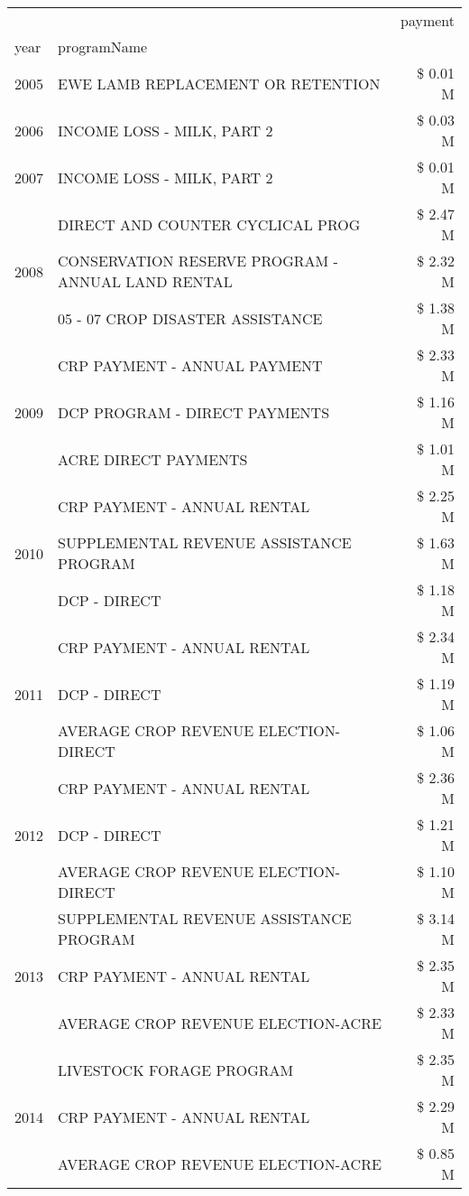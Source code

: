 \begin{tabular}{llr}
\toprule
 &  & payment \\
year & programName &  \\
\midrule
2005 & EWE LAMB REPLACEMENT OR RETENTION & \$ 0.01 M \\
\cline{1-3}
2006 & INCOME LOSS - MILK, PART 2 & \$ 0.03 M \\
\cline{1-3}
2007 & INCOME LOSS - MILK, PART 2 & \$ 0.01 M \\
\cline{1-3}
\multirow[t]{3}{*}{2008} & DIRECT AND COUNTER CYCLICAL PROG & \$ 2.47 M \\
 & CONSERVATION RESERVE PROGRAM - ANNUAL LAND RENTAL & \$ 2.32 M \\
 & 05 - 07 CROP DISASTER ASSISTANCE & \$ 1.38 M \\
\cline{1-3}
\multirow[t]{3}{*}{2009} & CRP PAYMENT - ANNUAL PAYMENT & \$ 2.33 M \\
 & DCP PROGRAM - DIRECT PAYMENTS & \$ 1.16 M \\
 & ACRE DIRECT PAYMENTS & \$ 1.01 M \\
\cline{1-3}
\multirow[t]{3}{*}{2010} & CRP PAYMENT - ANNUAL RENTAL & \$ 2.25 M \\
 & SUPPLEMENTAL REVENUE ASSISTANCE PROGRAM & \$ 1.63 M \\
 & DCP - DIRECT & \$ 1.18 M \\
\cline{1-3}
\multirow[t]{3}{*}{2011} & CRP PAYMENT - ANNUAL RENTAL & \$ 2.34 M \\
 & DCP - DIRECT & \$ 1.19 M \\
 & AVERAGE CROP REVENUE ELECTION-DIRECT & \$ 1.06 M \\
\cline{1-3}
\multirow[t]{3}{*}{2012} & CRP PAYMENT - ANNUAL RENTAL & \$ 2.36 M \\
 & DCP - DIRECT & \$ 1.21 M \\
 & AVERAGE CROP REVENUE ELECTION-DIRECT & \$ 1.10 M \\
\cline{1-3}
\multirow[t]{3}{*}{2013} & SUPPLEMENTAL REVENUE ASSISTANCE PROGRAM & \$ 3.14 M \\
 & CRP PAYMENT - ANNUAL RENTAL & \$ 2.35 M \\
 & AVERAGE CROP REVENUE ELECTION-ACRE & \$ 2.33 M \\
\cline{1-3}
\multirow[t]{3}{*}{2014} & LIVESTOCK FORAGE PROGRAM & \$ 2.35 M \\
 & CRP PAYMENT - ANNUAL RENTAL & \$ 2.29 M \\
 & AVERAGE CROP REVENUE ELECTION-ACRE & \$ 0.85 M \\
\cline{1-3}

\end{tabular}
